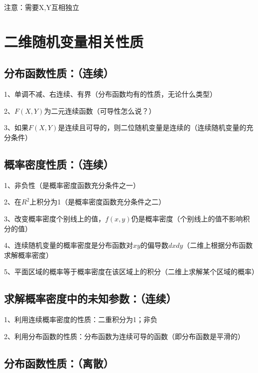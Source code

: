 注意：需要X,Y互相独立

\section{二维随机变量相关性质}



\subsection{分布函数性质：（连续）}

1、单调不减、右连续、有界（分布函数均有的性质，无论什么类型）

2、$F(X,Y)$为二元连续函数（可导性怎么说？）

3、如果$F(X,Y)$是连续且可导的，则二位随机变量是连续的（连续随机变量的充分条件）



\subsection{概率密度性质：（连续）}

1、非负性（是概率密度函数充分条件之一）

2、在$R^2$上积分为1（是概率密度函数充分条件之二）

3、改变概率密度个别线上的值，$f(x,y)$仍是概率密度（个别线上的值不影响积分的值）

4、连续随机变量的概率密度是分布函数对$xy$的偏导数$dxdy$（二维上根据分布函数求解概率密度）

5、平面区域的概率等于概率密度在该区域上的积分（二维上求解某个区域的概率）



\subsection{求解概率密度中的未知参数：（连续）}

1、利用连续概率密度的性质：二重积分为1；非负

2、利用分布函数的性质：分布函数为连续可导的函数（即分布函数是平滑的）



\subsection{分布函数性质：（离散）}

